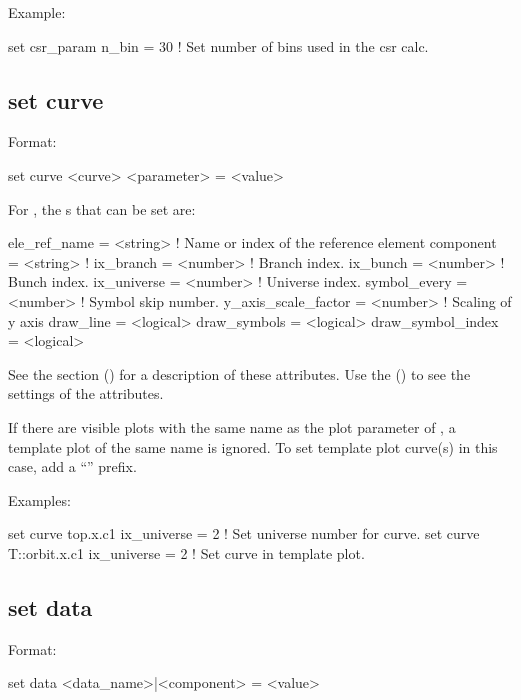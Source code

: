 {{Example:
\begin{example}
  set csr_param n_bin = 30  ! Set number of bins used in the csr calc.
\end{example}


\subsection{set curve}
\label{s:set.curve}

Format:
\begin{example}
  set curve <curve> <parameter> = <value>
\end{example}

For , the s that can be set are:
\begin{example}
  ele_ref_name        = <string>  ! Name or index of the reference element
  component           = <string>  ! 
  ix_branch           = <number>  ! Branch index.
  ix_bunch            = <number>  ! Bunch index.
  ix_universe         = <number>  ! Universe index.
  symbol_every        = <number>  ! Symbol skip number.
  y_axis_scale_factor = <number>  ! Scaling of y axis
  draw_line           = <logical> 
  draw_symbols        = <logical> 
  draw_symbol_index   = <logical> 
\end{example}
See the  section () for a description of these attributes.  Use
the  () to see the settings of the attributes.

If there are visible plots with the same name as the plot parameter of , a template plot
of the same name is ignored. To set template plot curve(s) in this case, add a ``'' prefix.

Examples:
\begin{example}
  set curve top.x.c1 ix_universe = 2       ! Set universe number for curve.
  set curve T::orbit.x.c1 ix_universe = 2  ! Set curve in template plot.
\end{example}


\subsection{set data}
\label{s:set.data}

Format:
\begin{example}
  set data <data_name>|<component> = <value>
\end{example}

}}
